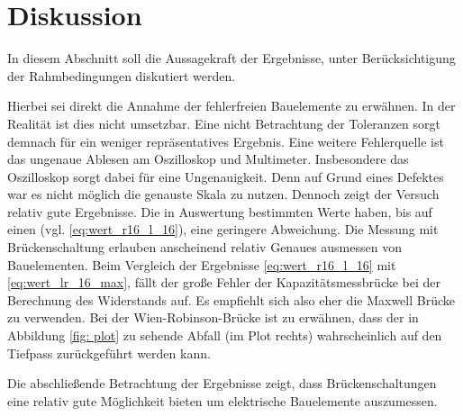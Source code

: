 \section{Diskussion}
In diesem Abschnitt soll die Aussagekraft der Ergebnisse, unter Berücksichtigung der  %
Rahmbedingungen diskutiert werden. %

Hierbei sei direkt die Annahme der fehlerfreien Bauelemente zu erwähnen.
In der Realität ist dies nicht umsetzbar.
Eine nicht Betrachtung der Toleranzen sorgt demnach für ein
weniger repräsentatives Ergebnis.
Eine weitere Fehlerquelle ist das ungenaue Ablesen am Oszilloskop und Multimeter.
Insbesondere das Oszilloskop sorgt dabei für eine Ungenauigkeit.
Denn auf Grund eines Defektes war es nicht möglich die genauste Skala zu nutzen.
Dennoch zeigt der Versuch relativ gute Ergebnisse.
Die in Auswertung bestimmten Werte haben, bis auf einen (vgl. \eqref{eq:wert_r16_l_16}), eine geringere Abweichung. %
Die Messung mit Brückenschaltung erlauben anscheinend relativ Genaues ausmessen von Bauelementen. %
Beim Vergleich der Ergebnisse \eqref{eq:wert_r16_l_16} mit \eqref{eq:wert_lr_16_max}, %
fällt der große Fehler der Kapazitätsmessbrücke bei der Berechnung des Widerstands
auf. Es empfiehlt sich also eher die Maxwell Brücke zu verwenden. %
Bei der Wien-Robinson-Brücke ist zu erwähnen, dass der in Abbildung \ref{fig: plot}
zu sehende Abfall (im Plot rechts) wahrscheinlich auf den Tiefpass zurückgeführt werden
kann.

Die abschließende Betrachtung der Ergebnisse zeigt,
dass Brückenschaltungen eine relativ gute Möglichkeit bieten um elektrische Bauelemente %
auszumessen.

